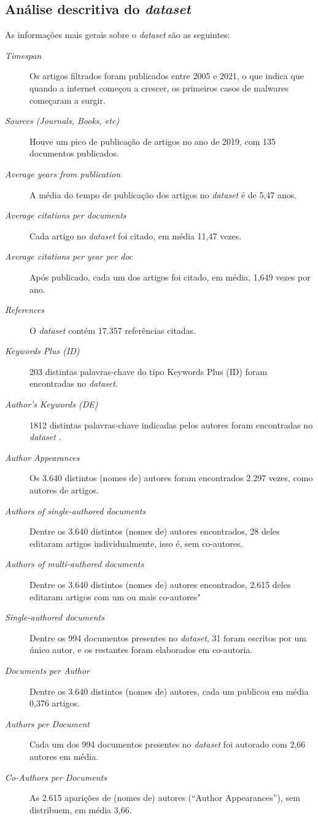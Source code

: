 \subsection{Análise descritiva do \textit{dataset} }

As informações mais gerais sobre o \textit{dataset} são as seguintes:
\begin{description}
    \item [\textit{Timespan}] Os artigos filtrados foram publicados entre 2005 e 2021, o que indica que quando a internet começou a crescer, os primeiros casos de malwares começaram a surgir.
    \item [\textit{Sources (Journals, Books, etc)}] Houve um pico de publicação de artigos no ano de 2019, com 135 documentos publicados.
    \item [\textit{Average years from publication}] A média do tempo de publicação dos artigos no \textit{dataset} é de 5,47 anos.
    \item [\textit{Average citations per documents}] Cada artigo no \textit{dataset} foi citado, em média 11,47 vezes.
    \item [\textit{Average citations per year per doc}] Após publicado, cada um dos artigos foi citado, em média, 1,649 vezes por ano.
    \item [\textit{References}] O \textit{dataset} contém 17.357 referências citadas.
    \item [\textit{Keywords Plus (ID)}] 203 distintas palavras-chave do tipo Keywords Plus (ID) foram encontradas no \textit{dataset}.
    \item [\textit{Author's Keywords (DE)}] 1812 distintas palavras-chave indicadas pelos autores foram encontradas no \textit{dataset} .
    \item [\textit{Author Appearances}] Os 3.640 distintos (nomes de) autores foram encontrados 2.297 vezes, como autores de artigos.
    \item [\textit{Authors of single-authored documents}] Dentre os 3.640 distintos (nomes de) autores encontrados, 28 deles editaram artigos individualmente, isso é, sem co-autores.
    \item [\textit{Authors of multi-authored documents}] Dentre os 3.640 distintos (nomes de) autores encontrados, 2.615 deles editaram artigos com um ou mais co-autores"
    \item [\textit{Single-authored documents}] Dentre os 994 documentos presentes no \textit{dataset}, 31 foram escritos por um único autor, e os restantes foram elaborados em co-autoria.
    \item [\textit{Documents per Author}] Dentre os 3.640 distintos (nomes de) autores, cada um publicou em média 0,376 artigos.
    \item [\textit{Authors per Document}] Cada um dos 994 documentos presentes no \textit{dataset} foi autorado com 2,66 autores em média.
    \item [\textit{Co-Authors per Documents}] As 2.615 aparições de (nomes de) autores (``Author Appearances''), sem distribuem, em média 3,66.
\end{description}

